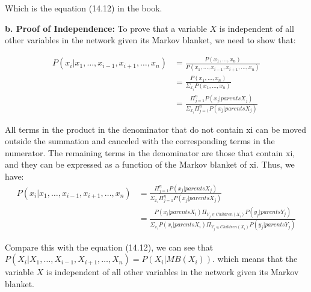 \documentclass[cn,12pt]{homework}
\begin{document}
\begin{solution}
Which is the equation (14.12) in the book.

\textbf{b. Proof of Independence:}
To prove that a variable \(X\) is independent of all other variables in the network given its Markov blanket, we need to show that:

\begin{align*}
P(x_i | x_1, \ldots, x_{i-1}, x_{i+1}, \ldots, x_n) &= \frac{P(x_1, \ldots, x_n)}{P(x_1, \ldots, x_{i-1}, x_{i+1}, \ldots, x_n)} \\
&= \frac{P(x_1, \ldots, x_n)}{\Sigma_{x_i} P(x_1, \ldots, x_n)} \\
&= \frac{\Pi_{j=1}^n P(x_j | parents X_j)}{\Sigma_{x_i} \Pi_{j=1}^n P(x_j | parents X_j)}
\end{align*}

All terms in the product in the denominator that do not contain xi can be moved outside the summation 
and canceled with the corresponding terms in the numerator. 
The remaining terms in the denominator are those that contain xi, and they can be expressed as a function of the Markov blanket of xi. Thus, we have:
\begin{align*}
P(x_i | x_1, \ldots, x_{i-1}, x_{i+1}, \ldots, x_n) &= \frac{\Pi_{j=1}^n P(x_j | parents X_j)}{\Sigma_{x_i} \Pi_{j=1}^n P(x_j | parents X_j)} \\
&= \frac{P(x_i | parents X_i) \Pi_{Y_j \in Children(X_i)} P(y_j | parents Y_j)}{\Sigma_{x_i} P(x_i | parents X_i) \Pi_{Y_j \in Children(X_i)} P(y_j | parents Y_j)}
\end{align*}

Compare this with the equation (14.12), we can see that 
$P(X_i | X_1, \ldots, X_{i-1}, X_{i+1}, \ldots, X_n) = P(X_i | MB(X_i))$.
which means that the variable \(X\) is independent of all other variables in the network given its Markov blanket.
\end{solution}


\newpage










\end{document}
